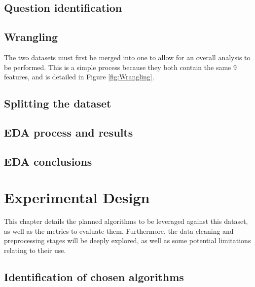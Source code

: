 \documentclass[12pt]{report}
\begin{document}
\section{Question identification}

\section{Wrangling}
The two datasets must first be merged into one to allow for an overall analysis to be performed.
This is a simple process because they both contain the same 9 features, and is detailed in Figure 
\ref{fig:Wrangling}.


\section{Splitting the dataset}

\section{EDA process and results}


\section{EDA conclusions}


\chapter{Experimental Design} %
This chapter details the planned algorithms to be leveraged against this dataset,
as well as the metrics to evaluate them. Furthermore, the data cleaning and preprocessing 
stages will be deeply explored, as well as some potential limitations relating to their use.

\section{Identification of chosen algorithms}
\end{document}
